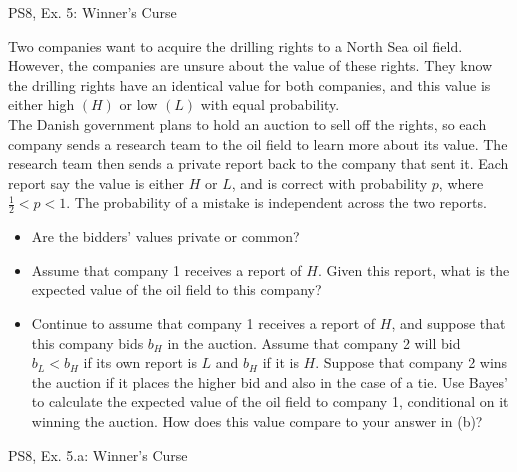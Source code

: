 \begin{frame}{PS8, Ex. 5: Winner's Curse}
    \begin{multicols}{2}
      Two companies want to acquire the drilling rights to a North Sea oil field. However, the companies are unsure about the value of these rights. They know the drilling rights have an identical value for both companies, and this value is either high $(H)$ or low $(L)$ with equal probability.\\\medskip
      The Danish government plans to hold an auction to sell off the rights, so each company sends a research team to the oil field to learn more about its value. The research team then sends a private report back to the company that sent it. Each report say the value is either $H$ or $L$, and is correct with probability $p$, where $\frac{1}{2} < p < 1$. The probability of a mistake is independent across the two reports.
      \vfill\null\columnbreak
      \begin{itemize}
        \item[(a)] Are the bidders’ values private or common?
        \item[(b)] Assume that company 1 receives a report of $H$. Given this report, what is the expected value of the oil field to this company?
        \item[(b)] Continue to assume that company 1 receives a report of $H$, and suppose that this company bids $b_H$ in the auction. Assume that company 2 will bid $b_L < b_H$ if its own report is $L$ and $b_H$ if it is $H$. Suppose that company 2 wins the auction if it places the higher bid and also in the case of a tie. Use Bayes’ to calculate the expected value of the oil field to company 1, conditional on it winning the auction. How does this value compare to your answer in (b)?
      \end{itemize}
      \vfill
    \end{multicols}
\end{frame}

\begin{frame}{PS8, Ex. 5.a: Winner's Curse}
    \begin{multicols}{2}
      \vfill\null\columnbreak
      \vfill\null
    \end{multicols}
\end{frame}
